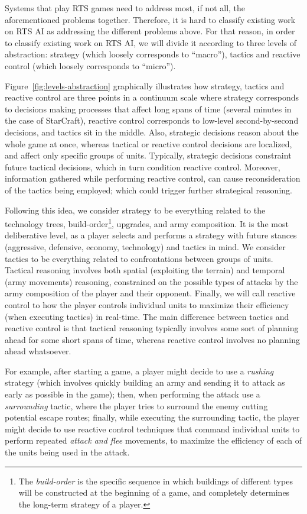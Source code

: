 \documentclass[journal]{IEEEtran}
\begin{document}
Systems that play RTS games need to address most, if not all, the aforementioned problems together. Therefore, it is hard to classify existing work on RTS AI as addressing the different problems above. For that reason, in order to classify existing work on RTS AI, we will divide it according to three levels of abstraction: strategy (which loosely corresponds to ``macro''), tactics and reactive control (which loosely corresponds to ``micro''). 

Figure~\ref{fig:levels-abstraction} graphically illustrates how strategy, tactics and reactive control are three points in a continuum scale where strategy corresponds to decisions making processes that affect long spans of time (several minutes in the case of StarCraft), reactive control corresponds to low-level second-by-second decisions, and tactics sit in the middle. Also, strategic decisions reason about the whole game at once, whereas tactical or reactive control decisions are localized, and affect only specific groups of units. Typically, strategic decisions constraint future tactical decisions, which in turn condition reactive control. Moreover, information gathered while performing reactive control, can cause reconsideration of the tactics being employed; which could trigger further strategical reasoning.

Following this idea, we consider strategy to be everything related to the technology trees, build-order\footnote{The {\em build-order} is the specific sequence in which buildings of different types will be constructed at the beginning of a game, and completely determines the long-term strategy of a player.}, upgrades, and army composition. It is the most deliberative level, as a player selects and performs a strategy with future stances (aggressive, defensive, economy, technology) and tactics in mind. We consider tactics to be everything related to confrontations between groups of units. Tactical reasoning involves both spatial (exploiting the terrain) and temporal (army movements) reasoning, constrained on the possible types of attacks by the army composition of the player and their opponent. Finally, we will call reactive control to how the player controls individual units to maximize their efficiency (when executing tactics) in real-time. The main difference between tactics and reactive control is that tactical reasoning typically involves some sort of planning ahead for some short spans of time, whereas reactive control involves no planning ahead whatsoever.

For example, after starting a game, a player might decide to use a {\em rushing} strategy (which involves quickly building an army and sending it to attack as early as possible in the game); then, when performing the attack use a {\em surrounding} tactic, where the player tries to surround the enemy cutting potential escape routes; finally, while executing the surrounding tactic, the player might decide to use reactive control techniques that command individual units to perform repeated {\em attack and flee} movements, to maximize the efficiency of each of the units being used in the attack.
\end{document}
